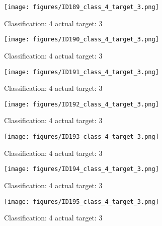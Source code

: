 \begin{figure}[h!]
\begin{center}
\texttt{[image: figures/ID189\_class\_4\_target\_3.png]}
\end{center}
\caption{ Classification: 4 actual target: 3}
\label{fig:ID189_class_4_target_3}
\end{figure}
\begin{figure}[h!]
\begin{center}
\texttt{[image: figures/ID190\_class\_4\_target\_3.png]}
\end{center}
\caption{ Classification: 4 actual target: 3}
\label{fig:ID190_class_4_target_3}
\end{figure}
\begin{figure}[h!]
\begin{center}
\texttt{[image: figures/ID191\_class\_4\_target\_3.png]}
\end{center}
\caption{ Classification: 4 actual target: 3}
\label{fig:ID191_class_4_target_3}
\end{figure}
\begin{figure}[h!]
\begin{center}
\texttt{[image: figures/ID192\_class\_4\_target\_3.png]}
\end{center}
\caption{ Classification: 4 actual target: 3}
\label{fig:ID192_class_4_target_3}
\end{figure}
\begin{figure}[h!]
\begin{center}
\texttt{[image: figures/ID193\_class\_4\_target\_3.png]}
\end{center}
\caption{ Classification: 4 actual target: 3}
\label{fig:ID193_class_4_target_3}
\end{figure}
\begin{figure}[h!]
\begin{center}
\texttt{[image: figures/ID194\_class\_4\_target\_3.png]}
\end{center}
\caption{ Classification: 4 actual target: 3}
\label{fig:ID194_class_4_target_3}
\end{figure}
\begin{figure}[h!]
\begin{center}
\texttt{[image: figures/ID195\_class\_4\_target\_3.png]}
\end{center}
\caption{ Classification: 4 actual target: 3}
\label{fig:ID195_class_4_target_3}
\end{figure}

